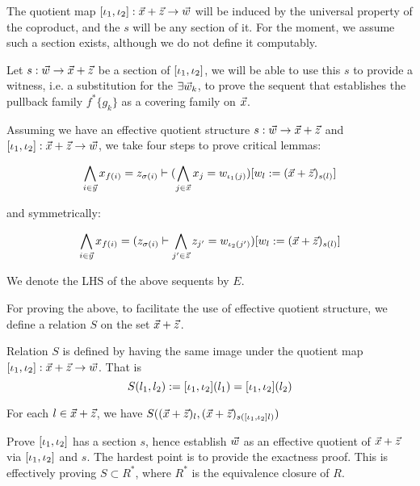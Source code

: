 The quotient map $[\iota_1,\iota_2]: \vec{x}+ \vec{z}\to \vec{w}$ will be induced by the
universal property of the coproduct, and the $s$ will be any section of it. For the moment, we assume such a section exists, although we do not define it
computably.

Let $s:\vec{w}\to \vec{x}+\vec{z}$ be a section of $[\iota_1,\iota_2]$, we will be able to use this $s$ to provide a witness, i.e. a substitution for the $\exists \vec{w}_k$, to prove the
sequent that establishes the pullback family $f^*\{g_k\}$ as a covering family on $\vec{x}$.


Assuming we have an effective quotient structure $s:\vec{w}\to \vec{x}+\vec{z}$ and $[\iota_1,\iota_2]:\vec{x}+\vec{z}\to \vec{w}$, we take four steps to prove critical lemmas:

  \begin{equation*}
    \bigwedge_{i\in \vec{y}} x_{f(i)} = z_{\sigma(i)} \vdash
     (\bigwedge_{j\in\vec{x}}x_j = w_{\iota_1(j)}) [w_l:=(\vec{x}+\vec{z})_{s(l)}]
   \end{equation*}

and symmetrically:

\begin{equation*}
  \bigwedge_{i\in \vec{y}} x_{f(i)} = (z_{\sigma(i)} \vdash \bigwedge_{j'\in\vec{z}}z_{j'}= w_{\iota_2(j')}) [w_l:=(\vec{x}+\vec{z})_{s(l)}]
\end{equation*}

We denote the LHS of the above sequents by $E$.

For proving the above, to facilitate the use of effective quotient structure, we define a relation $S$ on the set $\vec{x}+\vec{z}$.
\begin{definition}
  Relation $S$ is defined by having the same image under the quotient map $[\iota_1,\iota_2]:\vec{x}+\vec{z}\to \vec{w}$. That is
  \begin{equation}
    S(l_1,l_2):= [\iota_1,\iota_2](l_1) = [\iota_1,\iota_2](l_2)
  \end{equation}
\end{definition}



\begin{lemma}\label{Lem:CovWit1}
  For each $l\in \vec{x}+\vec{z}$, we have $S((\vec{x}+\vec{z})_l, (\vec{x}+\vec{z})_{s([\iota_1,\iota_2] l)})$
\end{lemma}

\begin{lemma}\label{Lem:CovWit2}
  Prove $[\iota_1,\iota_2]$ has a section $s$, hence establish $\vec{w}$ as an effective quotient of $\vec{x} +\vec{z}$ via $[\iota_1,\iota_2]$ and $s$.
  The hardest point is to provide the exactness proof.
  This is effectively proving $S\subset R^*$, where $R^*$ is the equivalence closure of $R$.
\end{lemma}


